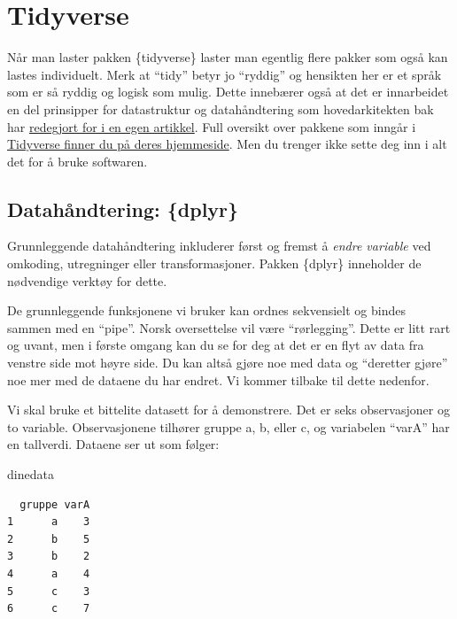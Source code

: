 \documentclass[
  letterpaper,
  DIV=11,
  numbers=noendperiod]{scrreprt}
\newenvironment{Shaded}{\begin{snugshade}}{\end{snugshade}}
\newcommand{\NormalTok}[1]{\textcolor[rgb]{0.00,0.23,0.31}{#1}}
\theoremstyle{definition}
\theoremstyle{remark}
\begin{document}
\hypertarget{tidyverse}{%
\section{Tidyverse}\label{tidyverse}}

Når man laster pakken \{tidyverse\} laster man egentlig flere pakker som
også kan lastes individuelt. Merk at ``tidy'' betyr jo ``ryddig'' og
hensikten her er et språk som er så ryddig og logisk som mulig. Dette
innebærer også at det er innarbeidet en del prinsipper for datastruktur
og datahåndtering som hovedarkitekten bak har
\href{https://www.jstatsoft.org/article/view/v059i10}{redegjort for i en
egen artikkel}. Full oversikt over pakkene som inngår i
\href{https://www.tidyverse.org/}{Tidyverse finner du på deres
hjemmeside}. Men du trenger ikke sette deg inn i alt det for å bruke
softwaren.

\hypertarget{datahuxe5ndtering-dplyr}{%
\subsection{Datahåndtering: \{dplyr\}}\label{datahuxe5ndtering-dplyr}}

Grunnleggende datahåndtering inkluderer først og fremst å \emph{endre
variable} ved omkoding, utregninger eller transformasjoner. Pakken
\{dplyr\} inneholder de nødvendige verktøy for dette.

De grunnleggende funksjonene vi bruker kan ordnes sekvensielt og bindes
sammen med en ``pipe''. Norsk oversettelse vil være ``rørlegging''.
Dette er litt rart og uvant, men i første omgang kan du se for deg at
det er en flyt av data fra venstre side mot høyre side. Du kan altså
gjøre noe med data og ``deretter gjøre'' noe mer med de dataene du har
endret. Vi kommer tilbake til dette nedenfor.

Vi skal bruke et bittelite datasett for å demonstrere. Det er seks
observasjoner og to variable. Observasjonene tilhører gruppe a, b, eller
c, og variabelen ``varA'' har en tallverdi. Dataene ser ut som følger:

\begin{Shaded}
\begin{Highlighting}[]
\NormalTok{dinedata}
\end{Highlighting}
\end{Shaded}

\begin{verbatim}
  gruppe varA
1      a    3
2      b    5
3      b    2
4      a    4
5      c    3
6      c    7
\end{verbatim}
\end{document}
